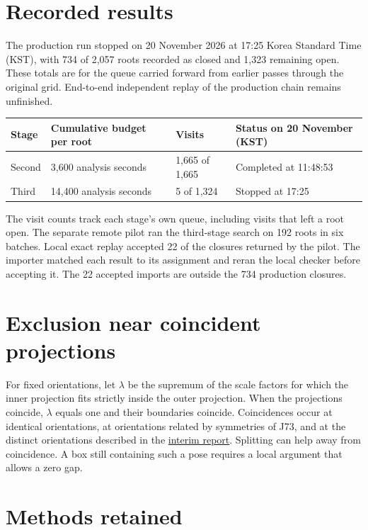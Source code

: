 \documentclass[11pt,a4paper]{amsart}
\newcommand{\interimpaper}{\href{https://doi.org/10.5281/zenodo.23725007}{interim report}}
\begin{document}
\section*{Recorded results}

The production run stopped on 20 November 2026 at 17:25 Korea Standard
Time (KST), with 734 of 2,057 roots recorded as closed and 1,323 remaining
open. These totals are for the queue carried forward from earlier
passes through the original grid. End-to-end independent replay of
the production chain remains unfinished.

\begin{center}
\small
\begin{tabular}{@{}llll@{}}
\toprule
Stage & Cumulative budget per root & Visits & Status on 20 November (KST) \\
\midrule
Second & 3,600 analysis seconds & 1,665 of 1,665 & Completed at 11:48:53 \\
Third & 14,400 analysis seconds & 5 of 1,324 & Stopped at 17:25 \\
\bottomrule
\end{tabular}
\end{center}

The visit counts track each stage's own queue, including visits that
left a root open. The separate remote pilot ran the third-stage search
on 192 roots in six batches. Local exact replay accepted 22 of the
closures returned by the pilot. The importer matched each result to its
assignment and reran the local checker before accepting it. The 22
accepted imports are outside the 734 production closures.

\section*{Exclusion near coincident projections}

For fixed orientations, let $\lambda$ be the supremum of the scale
factors for which the inner projection fits strictly inside the outer
projection. When the projections coincide, $\lambda$ equals one and
their boundaries coincide.
Coincidences occur at identical orientations, at orientations related
by symmetries of J73, and at the distinct orientations described in
the \interimpaper. Splitting can help away from coincidence. A box
still containing such a pose requires a local argument that allows
a zero gap.

\newpage
\section*{Methods retained}
\end{document}
